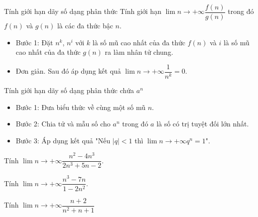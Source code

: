 \begin{dang}{Tính giới hạn dãy số dạng phân thức}
	Tính giới hạn	$\lim \limits{n \to +\infty}\dfrac{f\left(n\right)}{g\left(n\right)}$ trong đó $f\left(n\right)$ và $g\left(n\right)$ là các đa thức bậc $n$.\\
	\begin{itemize}
		\item Bước 1: Đặt $n^k$, $n^i$  với $k$ là số mũ cao nhất của đa thức $f\left(n\right)$ và $i$ là số mũ cao nhất của đa thức $g\left(n\right)$ ra làm nhân tử chung.
		\item Đơn giản. Sau đó áp dụng kết quả 	$\lim \limits{n \to +\infty}\dfrac{1}{n^k}=0$.
	\end{itemize}
\end{dang}
\begin{dang}{Tính giới hạn dãy số dạng phân thức chứa $a^n$}
	\begin{itemize}
		\item Bước 1: Đưa biểu thức về cùng một số mũ $n$.
		\item Bước 2: Chia tử và mẫu số cho $a^n$ trong đó $a$ là số có trị tuyệt đối lớn nhất.
		\item Bước 3: Áp dụng kết quả "Nếu $|q| <1$ thì $\lim \limits{n \to +\infty}q^n =1$".
	\end{itemize}
\end{dang}
\begin{vd}%
	Tính $\lim \limits{n \to +\infty}\dfrac{{{n}^2}-4{{n}^3}}{2{{n}^3}+5n-2}$.
\end{vd}
\begin{vd}%
	Tính $\lim \limits{n \to +\infty}\dfrac{{{n}^3}-7n}{1-2{{n}^2}}$.
\end{vd}
\begin{vd}%
	Tính $\lim \limits{n \to +\infty}\dfrac{n+2}{{{n}^2}+n+1}$
\end{vd}

